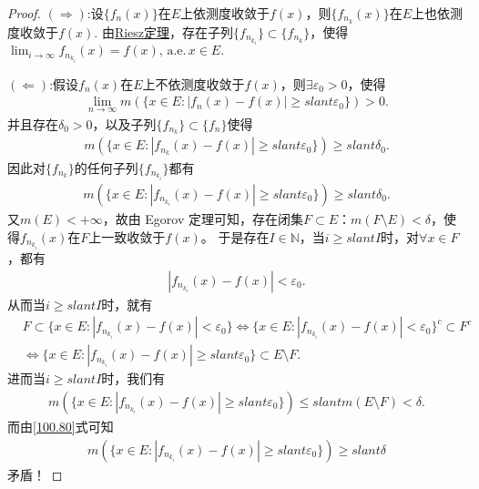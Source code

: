 \documentclass[../../main.tex]{subfiles}
\begin{document}
\begin{proof}
\((\Rightarrow)\):设$\{f_n(x)\}$在$E$上依测度收敛于$f(x)$，则$\{f_{n_k}(x)\}$在$E$上也依测度收敛于$f(x)$. 由\hyperref[theorem:Riesz定理]{Riesz定理}，存在子列\(\{f_{n_{k_i}}\} \subset \{f_{n_k}\}\)，使得$\lim_{i\to \infty}f_{n_{k_i}}(x)= f(x),\,\text{a.e.}\,x\in E.$

\((\Leftarrow)\):假设\(f_n(x)\)在\(E\)上不依测度收敛于\(f(x)\)，则\(\exists \varepsilon_0 > 0\)，使得
\begin{align*}
\underset{n\rightarrow \infty}{\lim}m(\{x\in E:|f_n(x)-f(x)|\geqslant slant \varepsilon _0\})>0.
\end{align*}
并且存在\(\delta_0 > 0\)，以及子列\(\{f_{n_k}\} \subset \{f_n\}\)使得
\begin{align*}
m(\{x \in E : |f_{n_k}(x) - f(x)| \geqslant slant \varepsilon_0\}) \geqslant slant \delta_0.
\end{align*}
因此对\(\{f_{n_k}\}\)的任何子列$\{f_{n_{k_i}}\}$都有
\begin{align}
m(\{x \in E : |f_{n_{k_i}}(x) - f(x)| \geqslant slant \varepsilon_0\}) \geqslant slant \delta_0.\label{100.80}
\end{align}
又\(m(E) < +\infty\)，故由 Egorov 定理可知，存在闭集\(F \subset E\)：\(m(F \setminus E) < \delta\)，使得\(f_{n_{k_i}}(x)\)在\(F\)上一致收敛于\(f(x)\)。
于是存在\(I \in \mathbb{N}\)，当\(i \geqslant slant I\)时，对\(\forall x \in F\)，都有
\begin{align*}
|f_{n_{k_i}}(x) - f(x)| < \varepsilon_0.
\end{align*}
从而当\(i \geqslant slant I\)时，就有
\begin{align*}
&F \subset \{x \in E : |f_{n_{k_i}}(x) - f(x)| < \varepsilon_0\} \Longleftrightarrow \{x \in E : |f_{n_{k_i}}(x) - f(x)| < \varepsilon_0\}^c \subset F^c \\
&\Longleftrightarrow \{x \in E : |f_{n_{k_i}}(x) - f(x)| \geqslant slant \varepsilon_0\} \subset E \setminus F.
\end{align*}
进而当\(i \geqslant slant I\)时，我们有
\begin{align*}
m(\{x \in E : |f_{n_{k_i}}(x) - f(x)| \geqslant slant \varepsilon_0\}) \leqslant slant m(E \setminus F) < \delta.
\end{align*}
而由\eqref{100.80}式可知
\begin{align*}
m(\{x \in E : |f_{n_{k_i}}(x) - f(x)| \geqslant slant \varepsilon_0\}) \geqslant slant \delta
\end{align*}
矛盾！
\end{proof}
\end{document}
